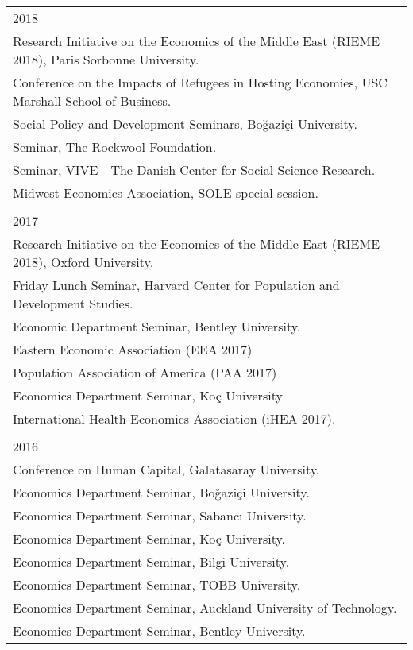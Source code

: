 \documentclass[12 pt]{article}
\begin{document}
\begin{longtable}{ccccc}
 \\ 
  \multicolumn{5}{l}{2018}\\
      \multicolumn{5}{l}{Research Initiative on the Economics of the Middle East (RIEME 2018), Paris Sorbonne University.} \\
     \multicolumn{5}{l}{Conference on the Impacts of Refugees in Hosting Economies,  USC Marshall School of Business.} \\
      \multicolumn{5}{l}{Social Policy and Development Seminars, Bo\u{g}azi\c{c}i University.} \\
   \multicolumn{5}{l}{Seminar, The Rockwool Foundation.}\\
         \multicolumn{5}{l}{Seminar, VIVE - The Danish Center for Social Science Research.} \\
      \multicolumn{5}{l}{Midwest Economics Association, SOLE special session.} \\
\\
  \multicolumn{5}{l}{2017}\\
      \multicolumn{5}{l}{Research Initiative on the Economics of the Middle East (RIEME 2018), Oxford University.} \\
 \multicolumn{5}{l}{Friday Lunch Seminar, Harvard Center for Population and Development Studies.}\\
  \multicolumn{5}{l}{Economic Department Seminar, Bentley University.  }\\
  \multicolumn{5}{l}{Eastern Economic Association (EEA 2017)} \\  
  \multicolumn{5}{l}{Population Association of America (PAA 2017)} \\
    \multicolumn{5}{l}{Economics Department Seminar, Ko\c{c} University} \\
    \multicolumn{5}{l}{International Health Economics Association (iHEA 2017).}\\
  

\\
   
   \multicolumn{5}{l}{2016}\\

\multicolumn{5}{l}{Conference on Human Capital, Galatasaray University.}   \\
\multicolumn{5}{l}{Economics Department Seminar, Bo\u{g}azi\c{c}i University.}   \\
\multicolumn{5}{l}{Economics Department Seminar, Sabanc{\i} University.}   \\
\multicolumn{5}{l}{Economics Department Seminar, Ko\c{c} University.}   \\
\multicolumn{5}{l}{Economics Department Seminar, Bilgi University.}   \\
\multicolumn{5}{l}{Economics Department Seminar, TOBB University.}   \\
\multicolumn{5}{l}{Economics Department Seminar, Auckland University of Technology.}   \\
\multicolumn{5}{l}{Economics Department Seminar, Bentley University.}   \\



\end{longtable}
\end{document}
